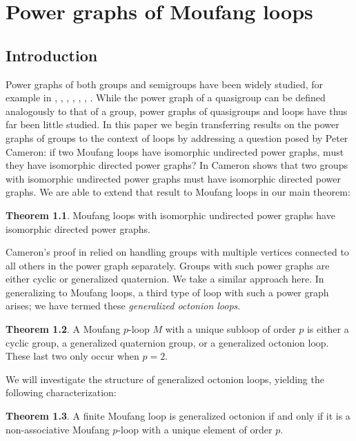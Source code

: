 \documentclass[12pt]{report}
\theoremstyle{definition}
\newtheorem{thm}{Theorem}[chapter]
\begin{document}

\chapter{Power graphs of Moufang loops}

\section{Introduction}

Power graphs of both groups and semigroups have been widely studied, for example in \cite{EPG}, \cite{PG},
  \cite{PGII}, \cite{Tor}, \cite{Feng}, \cite{Mog}, \cite{Panda}. While the power graph of a quasigroup
  can be defined analogously to that of a group, power graphs of quasigroups and loops have thus far been
  little studied. In this paper we begin transferring results on the power graphs of groups to the context
  of loops by addressing a question posed by Peter Cameron: if two Moufang loops have isomorphic undirected
  power graphs, must they have isomorphic directed power graphs? In \cite{PGII} Cameron shows that two groups
  with isomorphic undirected power graphs must have isomorphic directed power graphs. We are able to extend
  that result to Moufang loops in our main theorem:

\begin{thm}\label{mainThm}
  Moufang loops with isomorphic undirected power graphs have isomorphic directed power graphs.
\end{thm}

Cameron's proof in \cite{PGII} relied on handling groups with multiple vertices connected to all others in
  the power graph separately. Groups with such power graphs are either cyclic or generalized quaternion. We
  take a similar approach here. In generalizing to Moufang loops, a third type of loop with such a power graph
  arises; we have termed these \textit{generalized octonion loops}. 

\begin{thm}\label{moufangDesc}
  A Moufang $p$-loop $M$ with a unique subloop of order $p$ is either a cyclic group, a generalized quaternion
    group, or a generalized octonion loop. These last two only occur when $p = 2$.
\end{thm}

We will investigate the structure of generalized octonion loops, yielding the following characterization:

\begin{thm}\label{genOct}
  A finite Moufang loop is generalized octonion if and only if it is a non-associative Moufang $p$-loop
    with a unique element of order $p$.
\end{thm}
\end{document}
